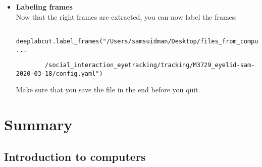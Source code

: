 \documentclass{article}
\begin{document}
\begin{itemize}
    \item \textbf{Labeling frames} \\
    Now that the right frames are extracted, you can now label the frames:
    \begin{verbatim}
        deeplabcut.label_frames("/Users/samsuidman/Desktop/files_from_computer_arne/shared_data ...
    \end{verbatim}
    \begin{verbatim}
        /social_interaction_eyetracking/tracking/M3729_eyelid-sam-2020-03-18/config.yaml")
    \end{verbatim}
    Make sure that you save the file in the end before you quit.
\end{itemize}

\section{Summary}

\subsection{Introduction to computers}
\end{document}
